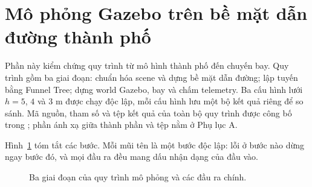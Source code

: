 
\section{Mô phỏng Gazebo trên bề mặt dẫn đường thành phố}\label{sec:gazebo}

Phần này kiểm chứng quy trình từ mô hình thành phố đến chuyến bay. Quy trình gồm
ba giai đoạn: chuẩn hóa scene và dựng bề mặt dẫn đường; lập tuyến bằng Funnel
Tree; dựng world Gazebo, bay và chấm telemetry. Ba cấu hình lưới $h=5$, $4$ và
$3$ m được chạy độc lập, mỗi cấu hình lưu một bộ kết quả riêng để so sánh. Mã
nguồn, tham số và tệp kết quả của toàn bộ quy trình được công bố trong
\cite{kien2026repo}; phần ánh xạ giữa thành phần và tệp nằm ở Phụ lục A.

Hình~\ref{fig:pipeline} tóm tắt các bước. Mỗi mũi tên là một bước độc lập: lỗi ở
bước nào dừng ngay bước đó, và mọi đầu ra đều mang dấu nhận dạng của đầu vào.

\begin{figure}[!t]
  \centering
  \caption{Ba giai đoạn của quy trình mô phỏng và các đầu ra chính.}
  \label{fig:pipeline}
\end{figure}

